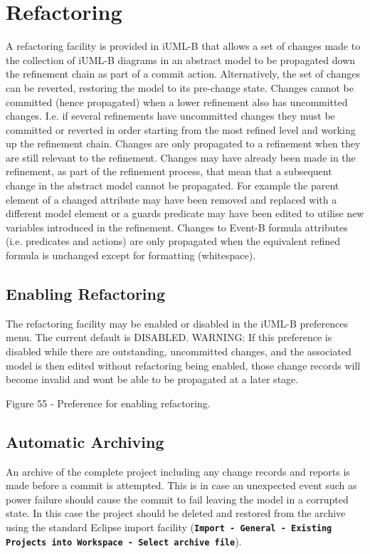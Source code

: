 \section{Refactoring}
\label{sec:component_diagrams-refactoring}

A refactoring facility is provided in iUML-B that allows a set of changes made to the collection of iUML-B diagrams in an abstract model to be propagated down the refinement chain as part of a commit action. Alternatively, the set of changes can be reverted, restoring the model to its pre-change state.
Changes cannot be committed (hence propagated) when a lower refinement also has uncommitted changes. I.e. if several refinements have uncommitted changes they must be committed or reverted in order starting from the most refined level and working up the refinement chain. 
Changes are only propagated to a refinement when they are still relevant to the refinement. Changes may have already been made in the refinement, as part of the refinement process, that mean that a subsequent change in the abstract model cannot be propagated. For example the parent element of a changed attribute may have been removed and replaced with a different model element or a guards predicate may have been edited to utilise new variables introduced in the refinement. Changes to Event-B formula attributes (i.e. predicates and actions) are only propagated when the equivalent refined formula is unchanged except for formatting (whitespace).

\subsection{Enabling Refactoring}

The refactoring facility may be enabled or disabled in the iUML-B preferences menu. The current default is DISABLED.  
WARNING: If this preference is disabled while there are outstanding, uncommitted changes, and the associated model is then edited without refactoring being enabled, those change records will become invalid and wont be able to be propagated at a later stage.

Figure 55 - Preference for enabling refactoring.

\subsection{Automatic Archiving}

An archive of the complete project including any change records and reports is made before a commit is attempted. This is in case an unexpected event such as power failure should cause the commit to fail leaving the model in a corrupted state. In this case the project should be deleted and restored from the archive using the standard Eclipse import facility (\textbf{\texttt{Import - General - Existing Projects into Workspace - Select archive file}}).

